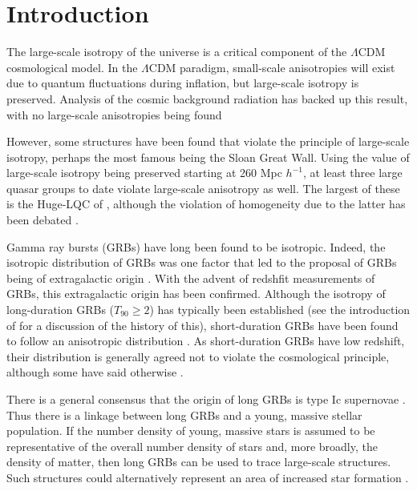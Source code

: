 \documentclass[fleqn,usenatbib]{mnras}
\begin{document}
\section{Introduction}

The large-scale isotropy of the universe is a critical component of the $\Lambda$CDM cosmological model. In the $\Lambda$CDM paradigm, small-scale anisotropies will exist due to quantum fluctuations during inflation, but large-scale isotropy is preserved. Analysis of the cosmic background radiation has backed up this result, with no large-scale anisotropies being found \citep{planck2015, liddle2000}

However, some structures have been found that violate the principle of large-scale isotropy, perhaps the most famous being the Sloan Great Wall. Using the \citet{yadav2010} value of large-scale isotropy being preserved starting at 260 Mpc $h^{-1}$, at least three large quasar groups to date violate large-scale anisotropy as well. The largest of these is the Huge-LQC of \citet{Clowes2013}, although the violation of homogeneity due to the latter has been debated \citep{Nadathur2013}.

Gamma ray bursts (GRBs) have long been found to be isotropic. Indeed, the isotropic distribution of GRBs was one factor that led to the proposal of GRBs being of extragalactic origin  \citep{briggs1996}. With the advent of redshfit measurements of GRBs, this extragalactic origin has been confirmed. Although the isotropy of long-duration GRBs ($T_{90} \geq 2$) has typically been established (see the introduction of \citet{Ripa2019} for a discussion of the history of this), short-duration GRBs have been found to follow an anisotropic distribution \citep{tarnopolski2017, vavrek2008}. As short-duration GRBs have low redshift, their distribution is generally agreed not to violate the cosmological principle, although some have said otherwise \citep{balazs2009}. 

There is a general consensus that the origin of long GRBs is type Ic supernovae \citep{sobacchi2017}. Thus there is a linkage between long GRBs and a young, massive stellar population. If the number density of young, massive stars is assumed to be representative of the overall number density of stars and, more broadly, the density of matter, then long GRBs can be used to trace large-scale structures. Such structures could alternatively represent an area of increased star formation \citep{Balazas2015}.
\end{document}
